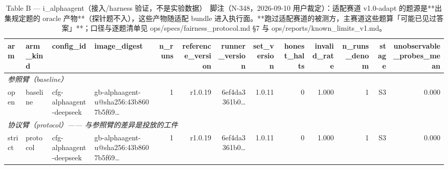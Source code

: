 \begin{table}[t]
\centering
\caption{Table B — i\_alphaagent（接入/harness 验证，不是实验数据）　脚注（N-348，2026-09-10 用户裁定）：适配赛道 v1.0-adapt 的题源是**出集规定题的 oracle 产物**（探针题不入），这些产物随适配 bundle 进入执行面。**跑过适配赛道的被测方，主赛道这些题算「可能已见过答案」**；口径与逐题清单见 ops/specs/fairness\_protocol.md §7 与 ops/reports/known\_limits\_v1.md。}
\label{tab:b-i_alphaagent}
\begin{tabular}{llllrrrrrrrrr}
\toprule
arm & arm\_kind & config\_id & image\_digest & n\_runs & reference\_version & runner\_version & set\_version & honest\_halts & invalid\_rate & n\_runs\_denom & stage & unobservable\_probes\_mean \\
\midrule
\multicolumn{13}{l}{\textit{参照臂（baseline）}} \\
open & baseline & cfg-alphaagent-deepseek & gb-alphaagent-u@sha256:43b8607b5f69… & 1 & r1.0.19 & 6ef4da3361b0… & 1.0.11 & 0 & 1.000 & 1 & S3 & 0.000 \\
\midrule
\multicolumn{13}{l}{\textit{协议臂（protocol）—— 与参照臂的差异是投放的工件}} \\
strict & protocol & cfg-alphaagent-deepseek & gb-alphaagent-u@sha256:43b8607b5f69… & 1 & r1.0.19 & 6ef4da3361b0… & 1.0.11 & 0 & 1.000 & 1 & S3 & 0.000 \\
\bottomrule
\end{tabular}
\end{table}

